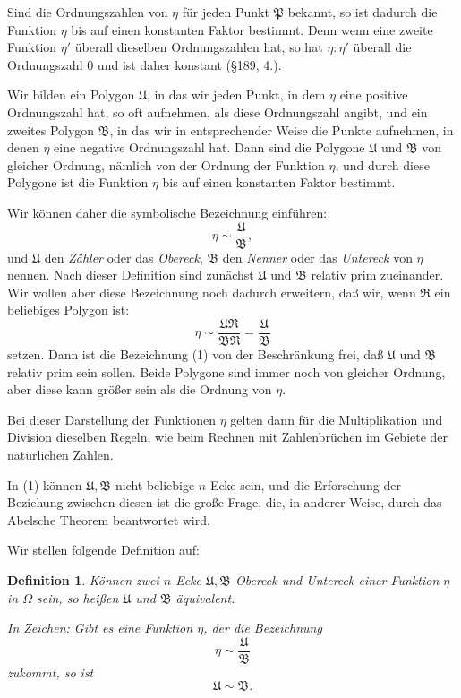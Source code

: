 \documentclass[12pt,a4paper]{article}
\newtheorem*{definition}{Definition}
\begin{document}
Sind die Ordnungszahlen von $\eta$ für jeden Punkt $\mathfrak{P}$ bekannt, so ist dadurch die Funktion $\eta$ bis auf einen konstanten Faktor bestimmt. Denn wenn eine zweite Funktion $\eta'$ überall dieselben Ordnungszahlen hat, so hat $\eta:\eta'$ überall die Ordnungszahl $0$ und ist daher konstant (\S 189, 4.).

Wir bilden ein Polygon $\mathfrak{U}$, in das wir jeden Punkt, in dem $\eta$ eine positive Ordnungszahl hat, so oft aufnehmen, als diese Ordnungszahl angibt, und ein zweites Polygon $\mathfrak{B}$, in das wir in entsprechender Weise die Punkte aufnehmen, in denen $\eta$ eine negative Ordnungszahl hat. Dann sind die Polygone $\mathfrak{U}$ und $\mathfrak{B}$ von gleicher Ordnung, nämlich von der Ordnung der Funktion $\eta$, und durch diese Polygone ist die Funktion $\eta$ bis auf einen konstanten Faktor bestimmt.

Wir können daher die symbolische Bezeichnung einführen:
\begin{equation}\label{eq:191-1}
\eta \sim \frac{\mathfrak{U}}{\mathfrak{B}},
\end{equation}
und $\mathfrak{U}$ den \emph{Zähler} oder das \emph{Obereck}, $\mathfrak{B}$ den \emph{Nenner} oder das \emph{Untereck} von $\eta$ nennen. Nach dieser Definition sind zunächst $\mathfrak{U}$ und $\mathfrak{B}$ relativ prim zueinander. Wir wollen aber diese Bezeichnung noch dadurch erweitern, daß wir, wenn $\mathfrak{R}$ ein beliebiges Polygon ist:
\begin{equation}\label{eq:191-2}
\eta \sim \frac{\mathfrak{U}\mathfrak{R}}{\mathfrak{B}\mathfrak{R}} = \frac{\mathfrak{U}}{\mathfrak{B}}
\end{equation}
setzen. Dann ist die Bezeichnung (1) von der Beschränkung frei, daß $\mathfrak{U}$ und $\mathfrak{B}$ relativ prim sein sollen. Beide Polygone sind immer noch von gleicher Ordnung, aber diese kann größer sein als die Ordnung von $\eta$.

Bei dieser Darstellung der Funktionen $\eta$ gelten dann für die Multiplikation und Division dieselben Regeln, wie beim Rechnen mit Zahlenbrüchen im Gebiete der natürlichen Zahlen.

In (1) können $\mathfrak{U}, \mathfrak{B}$ nicht beliebige $n$-Ecke sein, und die Erforschung der Beziehung zwischen diesen ist die große Frage, die, in anderer Weise, durch das Abelsche Theorem beantwortet wird.

Wir stellen folgende Definition auf:

\begin{definition}
Können zwei $n$-Ecke $\mathfrak{U}, \mathfrak{B}$ Obereck und Untereck einer Funktion $\eta$ in $\Omega$ sein, so heißen $\mathfrak{U}$ und $\mathfrak{B}$ \emph{äquivalent}.

In Zeichen: Gibt es eine Funktion $\eta$, der die Bezeichnung
\[
\eta \sim \frac{\mathfrak{U}}{\mathfrak{B}}
\]
zukommt, so ist
\begin{equation}\label{eq:191-3}
\mathfrak{U} \sim \mathfrak{B}.
\end{equation}
\end{definition}
\end{document}
